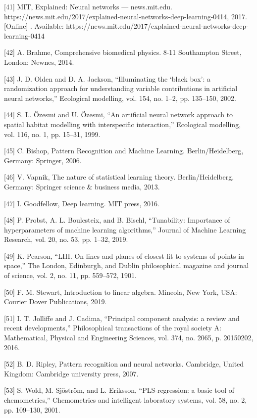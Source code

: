 \documentclass[sn-mathphys-num]{sn-jnl}%
\begin{document}
[41] MIT, Explained: Neural networks — news.mit.edu. https://news.mit.edu/2017/explained-neural-networks-deep-learning-0414, 2017. [Online] . Available: https://news.mit.edu/2017/explained-neural-networks-deep-learning-0414

[42] A. Brahme, Comprehensive biomedical physics. 8-11 Southampton Street, London: Newnes, 2014.

[43] J. D. Olden and D. A. Jackson, “Illuminating the ‘black box’: a randomization approach for understanding variable contributions in artificial neural networks,” Ecological modelling, vol. 154, no. 1–2, pp. 135–150, 2002.

[44] S. L. Özesmi and U. Özesmi, “An artificial neural network approach to spatial habitat modelling with interspecific interaction,” Ecological modelling, vol. 116, no. 1, pp. 15–31, 1999.

[45] C. Bishop, Pattern Recognition and Machine Learning. Berlin/Heidelberg, Germany: Springer, 2006.

[46] V. Vapnik, The nature of statistical learning theory. Berlin/Heidelberg, Germany: Springer science & business media, 2013.

[47] I. Goodfellow, Deep learning. MIT press, 2016.

[48] P. Probst, A. L. Boulesteix, and B. Bischl, “Tunability: Importance of hyperparameters of machine learning algorithms,” Journal of Machine Learning Research, vol. 20, no. 53, pp. 1–32, 2019.

[49] K. Pearson, “LIII. On lines and planes of closest fit to systems of points in space,” The London, Edinburgh, and Dublin philosophical magazine and journal of science, vol. 2, no. 11, pp. 559–572, 1901.

[50] F. M. Stewart, Introduction to linear algebra. Mineola, New York, USA: Courier Dover Publications, 2019.

[51] I. T. Jolliffe and J. Cadima, “Principal component analysis: a review and recent developments,” Philosophical transactions of the royal society A: Mathematical, Physical and Engineering Sciences, vol. 374, no. 2065, p. 20150202, 2016.

[52] B. D. Ripley, Pattern recognition and neural networks. Cambridge, United Kingdom: Cambridge university press, 2007.

[53] S. Wold, M. Sjöström, and L. Eriksson, “PLS-regression: a basic tool of chemometrics,” Chemometrics and intelligent laboratory systems, vol. 58, no. 2, pp. 109–130, 2001.
\end{document}
